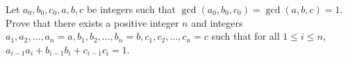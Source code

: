 Let $a_0,b_0,c_0,a,b,c$ be integers such that $\gcd(a_0,b_0,c_0)=\gcd(a,b,c)=1$. Prove that there exists a positive integer $n$ and integers $a_1,a_2,\ldots,a_n=a,b_1,b_2,\ldots,b_n=b,c_1,c_2,\ldots,c_n=c$ such that for all $1\le i\le n$,  $a_{i-1}a_i+b_{i-1}b_i+c_{i-1}c_i=1$.